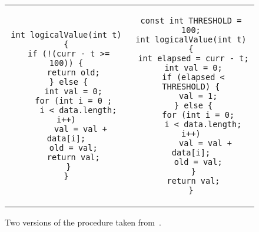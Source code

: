 \begin{figure}
\centering
\begin{tabular}{cc}
\begin{lstlisting}
int logicalValue(int t) {
 if (!(curr - t >= 100)) {
   return old;
 } else {
   int val = 0;
   for (int i = 0 ;
     i < data.length; i++)
      val = val + data[i];
   old = val;
   return val;
 }
}
\end{lstlisting}
&
\begin{lstlisting}
const int THRESHOLD = 100;
int logicalValue(int t) {
 int elapsed = curr - t;
 int val = 0;
 if (elapsed < THRESHOLD) {
   val = 1;
 } else {
   for (int i = 0;
     i < data.length; i++)
      val = val + data[i];
   old = val;
 }
 return val;
}
\end{lstlisting}
\end{tabular}
\caption{Two versions of the  procedure taken from~\cite{DwyerElbaumPerson08}.}
\end{figure} 